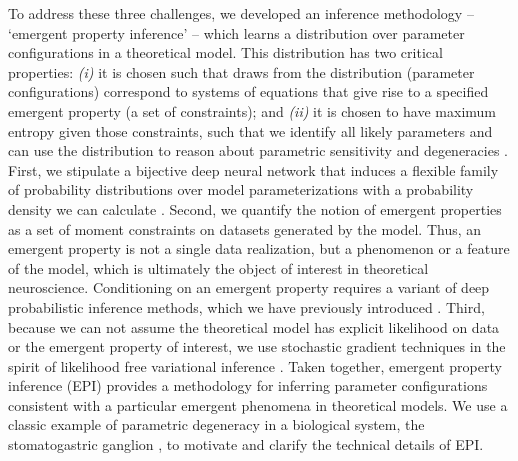 \documentclass[11pt]{article}
\begin{document}
To address these three challenges, we developed an inference methodology -- `emergent property inference' -- which learns a distribution over parameter configurations in a theoretical model.  
This distribution has two critical properties: \emph{(i)} it is chosen such that draws from the distribution (parameter configurations) correspond to systems of equations that give rise to a specified emergent property (a set of constraints); and \emph{(ii)} it is chosen to have maximum entropy given those constraints, such that we identify all likely parameters and can use the distribution to reason about parametric sensitivity and degeneracies \cite{transtrum2015perspective}.  
First, we stipulate a bijective deep neural network that induces a flexible family of probability distributions over model parameterizations with a probability density we can calculate \cite{rezende2015variational, dinh2016density, papamakarios2017masked}.
Second, we quantify the notion of emergent properties as a set of moment constraints on datasets generated by the model.  
Thus, an emergent property is not a single data realization, but a phenomenon or a feature of the model, which is ultimately the object of interest in theoretical neuroscience.
Conditioning on an emergent property requires a variant of deep probabilistic inference methods, which we have previously introduced \cite{loaiza2017maximum}.
Third,  because we can not assume the theoretical model has explicit likelihood on data or the emergent property of interest, we use stochastic gradient techniques in the spirit of likelihood free variational inference \cite{tran2017hierarchical}.    
Taken together, emergent property inference (EPI) provides a methodology for inferring parameter configurations consistent with a particular emergent phenomena in theoretical models.
We use a classic example of parametric degeneracy in a biological system, the stomatogastric ganglion \cite{goldman2001global}, to motivate and clarify the technical details of EPI.
\end{document}
